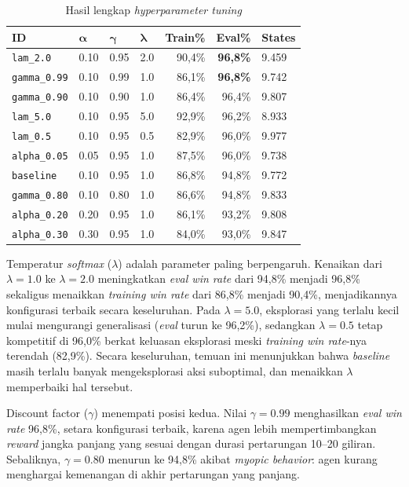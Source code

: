 \documentclass[11pt,a4paper,oneside]{report}
\begin{document}
\begin{table}[h!]
\centering
\caption{Hasil lengkap \textit{hyperparameter tuning}}
\label{tab:tuning-results}
\begin{tabular}{llllrrl}
\toprule
\textbf{ID} & $\boldsymbol{\alpha}$ & $\boldsymbol{\gamma}$ & $\boldsymbol{\lambda}$ & \textbf{Train\%} & \textbf{Eval\%} & \textbf{States} \\
\midrule
\texttt{lam\_2.0}   & 0.10 & 0.95 & 2.0 & 90,4\% & \textbf{96,8\%} & 9.459 \\
\texttt{gamma\_0.99}& 0.10 & 0.99 & 1.0 & 86,1\% & \textbf{96,8\%} & 9.742 \\
\texttt{gamma\_0.90}& 0.10 & 0.90 & 1.0 & 86,4\% & 96,4\%          & 9.807 \\
\texttt{lam\_5.0}   & 0.10 & 0.95 & 5.0 & 92,9\% & 96,2\%          & 8.933 \\
\texttt{lam\_0.5}   & 0.10 & 0.95 & 0.5 & 82,9\% & 96,0\%          & 9.977 \\
\texttt{alpha\_0.05}& 0.05 & 0.95 & 1.0 & 87,5\% & 96,0\%          & 9.738 \\
\texttt{baseline}   & 0.10 & 0.95 & 1.0 & 86,8\% & 94,8\%          & 9.772 \\
\texttt{gamma\_0.80}& 0.10 & 0.80 & 1.0 & 86,6\% & 94,8\%          & 9.833 \\
\texttt{alpha\_0.20}& 0.20 & 0.95 & 1.0 & 86,1\% & 93,2\%          & 9.808 \\
\texttt{alpha\_0.30}& 0.30 & 0.95 & 1.0 & 84,0\% & 93,0\%          & 9.847 \\
\bottomrule
\end{tabular}
\end{table}

Temperatur \textit{softmax} ($\lambda$) adalah parameter paling berpengaruh. Kenaikan dari $\lambda = 1.0$ ke $\lambda = 2.0$ meningkatkan \textit{eval win rate} dari 94,8\% menjadi 96,8\% sekaligus menaikkan \textit{training win rate} dari 86,8\% menjadi 90,4\%, menjadikannya konfigurasi terbaik secara keseluruhan. Pada $\lambda = 5.0$, eksplorasi yang terlalu kecil mulai mengurangi generalisasi (\textit{eval} turun ke 96,2\%), sedangkan $\lambda = 0.5$ tetap kompetitif di 96,0\% berkat keluasan eksplorasi meski \textit{training win rate}-nya terendah (82,9\%). Secara keseluruhan, temuan ini menunjukkan bahwa \textit{baseline} masih terlalu banyak mengeksplorasi aksi suboptimal, dan menaikkan $\lambda$ memperbaiki hal tersebut.

Discount factor ($\gamma$) menempati posisi kedua. Nilai $\gamma = 0.99$ menghasilkan \textit{eval win rate} 96,8\%, setara konfigurasi terbaik, karena agen lebih mempertimbangkan \textit{reward} jangka panjang yang sesuai dengan durasi pertarungan 10--20 giliran. Sebaliknya, $\gamma = 0.80$ menurun ke 94,8\% akibat \textit{myopic behavior}: agen kurang menghargai kemenangan di akhir pertarungan yang panjang.
\end{document}
